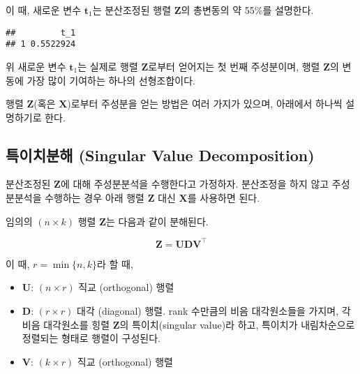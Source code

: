 \documentclass[]{book}
\newenvironment{Shaded}{\begin{snugshade}}{\end{snugshade}}
\newcommand{\ControlFlowTok}[1]{\textcolor[rgb]{0.13,0.29,0.53}{\textbf{#1}}}
\newcommand{\DecValTok}[1]{\textcolor[rgb]{0.00,0.00,0.81}{#1}}
\newcommand{\KeywordTok}[1]{\textcolor[rgb]{0.13,0.29,0.53}{\textbf{#1}}}
\newcommand{\NormalTok}[1]{#1}
\newcommand{\OperatorTok}[1]{\textcolor[rgb]{0.81,0.36,0.00}{\textbf{#1}}}
\newcommand{\StringTok}[1]{\textcolor[rgb]{0.31,0.60,0.02}{#1}}
\providecommand{\tightlist}{%
  \setlength{\itemsep}{0pt}\setlength{\parskip}{0pt}}
\begin{document}
이 때, 새로운 변수 \(\mathbf{t}_1\)는 분산조정된 행렬 \(\mathbf{Z}\)의 총변동의 약 55\%를 설명한다.

\begin{Shaded}
\end{Shaded}

\begin{verbatim}
##         t_1
## 1 0.5522924
\end{verbatim}

위 새로운 변수 \(\mathbf{t}_1\)는 실제로 행렬 \(\mathbf{Z}\)로부터 얻어지는 첫 번째 주성분이며, 행렬 \(\mathbf{Z}\)의 변동에 가장 많이 기여하는 하나의 선형조합이다.

행렬 \(\mathbf{Z}\)(혹은 \(\mathbf{X}\))로부터 주성분을 얻는 방법은 여러 가지가 있으며, 아래에서 하나씩 설명하기로 한다.

\hypertarget{pca-svd}{%
\subsection{특이치분해 (Singular Value Decomposition)}\label{pca-svd}}

분산조정된 \(\mathbf{Z}\)에 대해 주성분분석을 수행한다고 가정하자. 분산조정을 하지 않고 주성분분석을 수행하는 경우 아래 행렬 \(\mathbf{Z}\) 대신 \(\mathbf{X}\)를 사용하면 된다.

임의의 \((n \times k)\) 행렬 \(\mathbf{Z}\)는 다음과 같이 분해된다.

\begin{equation}
\mathbf{Z} = \mathbf{U} \mathbf{D} \mathbf{V}^\top \label{eq:pca-svd}
\end{equation}

이 때, \(r = \min\{n, k\}\)라 할 때,

\begin{itemize}
\tightlist
\item
  \(\mathbf{U}\): \((n \times r)\) 직교 (orthogonal) 행렬
\item
  \(\mathbf{D}\): \((r \times r)\) 대각 (diagonal) 행렬. rank 수만큼의 비음 대각원소들을 가지며, 각 비음 대각원소를 힝렬 \(\mathbf{Z}\)의 특이치(singular value)라 하고, 특이치가 내림차순으로 정렬되는 형태로 행렬이 구성된다.
\item
  \(\mathbf{V}\): \((k \times r)\) 직교 (orthogonal) 행렬
\end{itemize}
\end{document}
